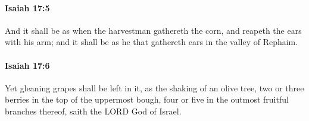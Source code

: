 		\paragraph{Isaiah 17:5} %
			\label{ISAIAH-17-5}

			And it shall be as when the harvestman gathereth the corn, and reapeth the ears with his arm; and it shall be as he that gathereth ears in the valley of Rephaim.


		\paragraph{Isaiah 17:6} %
			\label{ISAIAH-17-6}

			Yet gleaning grapes shall be left in it, as the shaking of an olive tree, two or three berries in the top of the uppermost bough, four or five in the outmost fruitful branches thereof, saith the LORD God of Israel.


